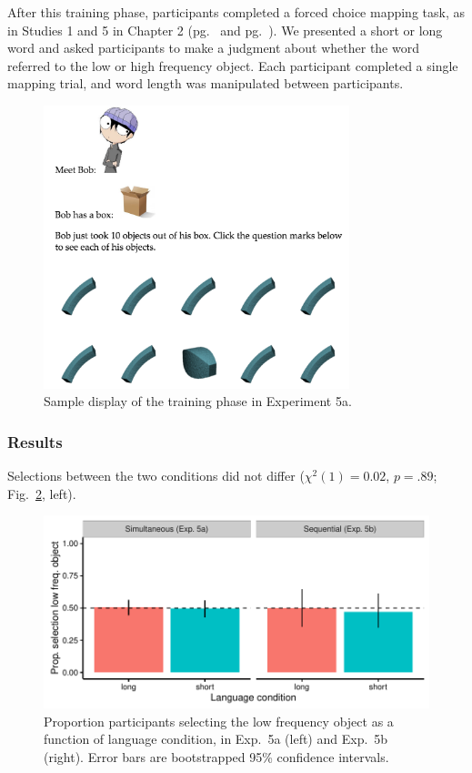After this training phase, participants completed a forced choice mapping task, as in Studies 1 and 5 in Chapter 2 (pg.\ \pageref{ch2-1} and pg.\ \pageref{ch2-5}). We presented a short or long word and asked participants to make a judgment about whether the word referred to the low or high frequency object. Each participant completed a single mapping trial, and word length was manipulated between participants.

 \begin{figure}[t!]
 \begin{center}
  \includegraphics[width=3.5in]{figs/seqfreq_display.png}
  \caption{\label{fig:seqfreq_display} Sample display of the training phase in Experiment 5a.}
 \end{center}
\end{figure}


 \subsubsection{Results}
 Selections between the two conditions did not differ (${\chi}^2$$(1) = 0.02$, $p = .89$; Fig.\ \ref{fig:freq_plots}, left).
 
  \begin{figure}[t!]
 \begin{center}
  \includegraphics[width=6in]{figs/freq_plots.pdf}
  \caption{\label{fig:freq_plots} Proportion participants selecting the low frequency object as a function of language condition, in Exp.\ 5a (left) and Exp.\ 5b (right). Error bars are bootstrapped 95\% confidence intervals.}
 \end{center}
\end{figure}



